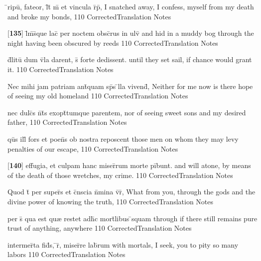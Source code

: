 \latline
  {\={}ripu\={\macron {\i}}, fateor, l\={}t\={} m\={} et vincula r\={}p\={\macron {\i}},}
  { I snatched away, I confess, myself from my death and broke my bonds, }
  {110}
  { CorrectedTranslation }
  { Notes }


\latline
  {[\textbf{135}] l\={\macron {\i}}m\={}s\={}que lac\={} per noctem obsc\={}rus in ulv\={}}
  { and hid in a muddy bog through the night having been obscured by reeds }
  {110}
  { CorrectedTranslation }
  { Notes }


\latline
  {d\={}litu\={\macron {\i}} dum v\={}la darent, s\={\macron {\i}} forte dedissent.}
  { until they set sail, if chance would grant it. }
  {110}
  { CorrectedTranslation }
  { Notes }


\latline
  {Nec mihi jam patriam ant\={\macron {\i}}quam sp\={}s \={}lla vivend\={\macron {\i}},}
  { Neither for me now is there hope of seeing my old homeland}
  {110}
  { CorrectedTranslation }
  { Notes }


\latline
  {nec dulc\={\macron {\i}}s n\={}t\={}s exopt\={}tumque parentem,}
  { nor of seeing sweet sons and my desired father,}
  {110}
  { CorrectedTranslation }
  { Notes }


\latline
  {qu\={}s ill\={\macron {\i}} fors et poen\={}s ob nostra reposcent}
  { those men on whom they may levy penalties of our escape, }
  {110}
  { CorrectedTranslation }
  { Notes }


\latline
  {[\textbf{140}] effugia, et culpam hanc miser\={}rum morte pi\={}bunt.}
  { and will atone, by means of the death of those wretches, my crime.  }
  {110}
  { CorrectedTranslation }
  { Notes }


\latline
  {Quod t\={} per super\={}s et c\={}nscia n\={}mina v\={}r\={\macron {\i}},}
  { What from you, through the gods and the divine power of knowing the truth, }
  {110}
  { CorrectedTranslation }
  { Notes }


\latline
  {per s\={\macron {\i}} qua est qu{\ae} restet adh\={}c mort\={}libus \={}squam}
  { through if there still remains pure trust of anything, anywhere  }
  {110}
  { CorrectedTranslation }
  { Notes }


\latline
  {intermer\={}ta fid\={}s, \={}r\={}, miser\={}re lab\={}rum}
  { with mortals, I seek, you to pity so many labors }
  {110}
  { CorrectedTranslation }
  { Notes }


